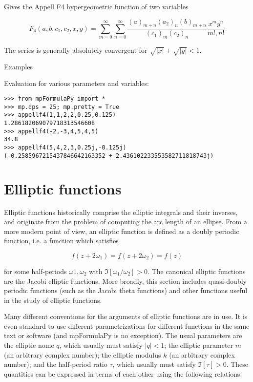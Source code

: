 \vpara
Gives the Appell F4 hypergeometric function of two variables

\begin{equation}
F_4(a,b,c_1,c_2,x,y) = \sum_{m=0}^{\infty} \sum_{n=0}^{\infty} \frac{(a)_{m+n}(a_2)_{n}(b)_{m+n}}{(c_1)_m (c_2)_n} \frac{x^my^n}{m!,n!}
\end{equation} 


The series is generally absolutely convergent for $\sqrt{|x|} + \sqrt{|y|}  <1$.

Examples

Evaluation for various parameters and variables:

\begin{lstlisting}
>>> from mpFormulaPy import *
>>> mp.dps = 25; mp.pretty = True
>>> appellf4(1,1,2,2,0.25,0.125)
1.286182069079718313546608
>>> appellf4(-2,-3,4,5,4,5)
34.8
>>> appellf4(5,4,2,3,0.25j,-0.125j)
(-0.2585967215437846642163352 + 2.436102233553582711818743j)
\end{lstlisting}





\newpage
\chapter{Elliptic functions}
Elliptic functions historically comprise the elliptic integrals and their inverses, and originate from the problem of computing the arc length of an ellipse. From a more modern point of view, an elliptic function is defined as a doubly periodic function, i.e. a function which
satisfies

\begin{equation}
f(z+2\omega_1) = f(z+2\omega_2) = f(z)
\end{equation}

for some half-periods $\omega1, \omega_2$ with $\Im[\omega_1/\omega_2]>0$. The canonical elliptic functions are the Jacobi elliptic functions. More broadly, this section includes quasi-doubly periodic functions (such as the Jacobi theta functions) and other functions useful in the study of elliptic functions.

\vpara
Many different conventions for the arguments of elliptic functions are in use. It is even standard to use different parametrizations for different functions in the same text or software (and mpFormulaPy is no exception). The usual parameters are the elliptic nome $q$, which
usually must satisfy $|q|<1$; the elliptic parameter $m$ (an arbitrary complex number); the elliptic modulus $k$ (an arbitrary complex number); and the half-period ratio $\tau$, which usually must satisfy $\Im[\tau]>0$. These quantities can be expressed in terms of each other using the following relations:

